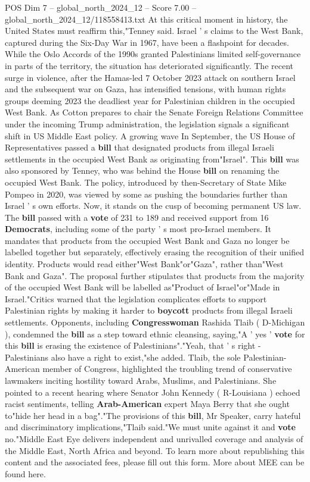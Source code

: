 \begin{textsample}{POS Dim 7 – global\_north\_2024\_12 – Score 7.00 – global\_north\_2024\_12/118558413.txt}
At this critical moment in history, the United States must reaffirm this,"Tenney said.
Israel ' s claims to the West Bank, captured during the Six-Day War in 1967, have been a flashpoint for decades.
While the Oslo Accords of the 1990s granted Palestinians limited self-governance in parts of the territory, the situation has deteriorated significantly.
The recent surge in violence, after the Hamas-led 7 October 2023 attack on southern Israel and the subsequent war on Gaza, has intensified tensions, with human rights groups deeming 2023 the deadliest year for Palestinian children in the occupied West Bank.
As Cotton prepares to chair the Senate Foreign Relations Committee under the incoming Trump administration, the legislation signals a significant shift in US Middle East policy.
A growing wave In September, the US House of Representatives passed a \textbf{bill} that designated products from illegal Israeli settlements in the occupied West Bank as originating from"Israel".
This \textbf{bill} was also sponsored by Tenney, who was behind the House \textbf{bill} on renaming the occupied West Bank.
The policy, introduced by then-Secretary of State Mike Pompeo in 2020, was viewed by some as pushing the boundaries further than Israel ' s own efforts.
Now, it stands on the cusp of becoming permanent US law.
The \textbf{bill} passed with a \textbf{vote} of 231 to 189 and received support from 16 \textbf{Democrats}, including some of the party ' s most pro-Israel members.
It mandates that products from the occupied West Bank and Gaza no longer be labelled together but separately, effectively erasing the recognition of their unified identity.
Products would read either"West Bank"or"Gaza", rather than"West Bank and Gaza".
The proposal further stipulates that products from the majority of the occupied West Bank will be labelled as"Product of Israel"or"Made in Israel."Critics warned that the legislation complicates efforts to support Palestinian rights by making it harder to \textbf{boycott} products from illegal Israeli settlements.
Opponents, including \textbf{Congresswoman} Rashida Tlaib ( D-Michigan ), condemned the \textbf{bill} as a step toward ethnic cleansing, saying,"A ' yes ' \textbf{vote} for this \textbf{bill} is erasing the existence of Palestinians"."Yeah, that ' s right - Palestinians also have a right to exist,"she added.
Tlaib, the sole Palestinian-American member of Congress, highlighted the troubling trend of conservative lawmakers inciting hostility toward Arabs, Muslims, and Palestinians.
She pointed to a recent hearing where Senator John Kennedy ( R-Louisiana ) echoed racist sentiments, telling \textbf{Arab-American} expert Maya Berry that she ought to"hide her head in a bag"."The provisions of this \textbf{bill}, Mr Speaker, carry hateful and discriminatory implications,"Tlaib said."We must unite against it and \textbf{vote} no."Middle East Eye delivers independent and unrivalled coverage and analysis of the Middle East, North Africa and beyond.
To learn more about republishing this content and the associated fees, please fill out this form.
More about MEE can be found here.

\end{textsample}
